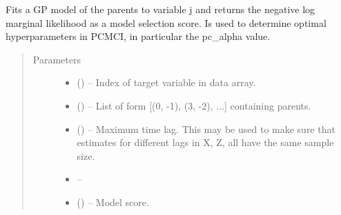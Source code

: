 \documentclass[letterpaper,10pt,english]{sphinxmanual}
\begin{document}
\begin{fulllineitems}
\begin{fulllineitems}
Fits a GP model of the parents to variable j and returns the negative
log marginal likelihood as a model selection score. Is used to determine
optimal hyperparameters in PCMCI, in particular the pc\_alpha value.
\begin{quote}\begin{description}
\item[{Parameters}] \leavevmode\begin{itemize}
\item {} 
 () -- Index of target variable in data array.

\item {} 
 () -- List of form {[}(0, -1), (3, -2), ...{]} containing parents.

\item {} 
 (\sphinxstyleliteralemphasis{, }\sphinxstyleliteralemphasis{ (}\sphinxstyleliteralemphasis{)}\sphinxstyleliteralemphasis{}) -- Maximum time lag. This may be used to make sure that estimates for
different lags in X, Z, all have the same sample size.

\item {} 
 -- 

\item {} 
 () -- Model score.

\end{itemize}

\end{description}\end{quote}

\end{fulllineitems}


\end{fulllineitems}

\end{document}
